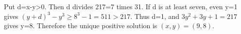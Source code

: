 Put d=x-y>0. Then d divides 217=7 times 31. If d is at least seven, even y=1 gives $(y+d)^3-y^3\ge8^3-1=511>217$. Thus d=1, and $3y^2+3y+1=217$ gives y=8. Therefore the unique positive solution is $\boxed{(x,y)=(9,8)}$.
